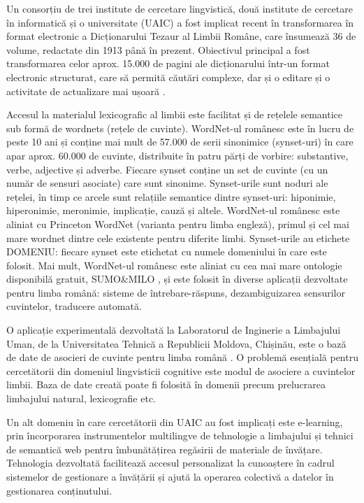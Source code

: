 \begin{multicols}{2}
Un consorțiu de trei institute de cercetare lingvistică, două institute de cercetare în informatică și o universitate (UAIC) a fost implicat recent în transformarea în format electronic a Dicționarului Tezaur al Limbii Române, care însumează 36 de volume, redactate din 1913 până în prezent. Obiectivul principal a fost transformarea celor aprox. 15.000 de pagini ale dicționarului într-un format electronic structurat, care să permită căutări complexe, dar și o editare și o activitate de actualizare mai ușoară \cite{cristea3}.

Accesul la materialul lexicografic al limbii este facilitat și de rețelele semantice sub formă de wordnets (rețele de cuvinte). WordNet-ul românesc este în lucru de peste 10 ani și conține mai mult de 57.000 de serii sinonimice (synset-uri) în care apar aprox. 60.000 de cuvinte, distribuite în patru părți de vorbire: substantive, verbe, adjective și adverbe. Fiecare synset conține un set de cuvinte (cu un număr de sensuri asociate) care sunt sinonime. Synset-urile sunt noduri ale rețelei, în timp ce arcele sunt relațiile semantice dintre synset-uri: hiponimie, hiperonimie, meronimie, implicație, cauză și altele. WordNet-ul românesc este aliniat cu Princeton WordNet \cite{wnURL} (varianta pentru limba engleză), primul și cel mai mare wordnet dintre cele existente pentru diferite limbi. Synset-urile au etichete DOMENIU: fiecare synset este etichetat cu numele domeniului în care este folosit. Mai mult, WordNet-ul românesc este aliniat cu cea mai mare ontologie disponibilă gratuit, SUMO\&MILO \cite{ro_wnURL}, și este folosit în diverse aplicații dezvoltate pentru limba română: sisteme de întrebare-răspuns, dezambiguizarea sensurilor cuvintelor, traducere automată.

O aplicație experimentală dezvoltată la Laboratorul de Inginerie a Limbajului Uman, de la Universitatea Tehnică a Republicii Moldova, Chișinău, este o bază de date de asocieri de cuvinte pentru limba română \cite{sem_dict}. O problemă esențială pentru cercetătorii din domeniul lingvisticii cognitive este modul de asociere a cuvintelor limbii. Baza de date creată poate fi folosită în domenii precum prelucrarea limbajului natural, lexicografie etc.

Un alt domeniu în care cercetătorii din UAIC au fost implicați este e-learning, prin încorporarea instrumentelor multilingve de tehnologie a limbajului și tehnici de semantică web pentru îmbunătățirea regăsirii de materiale de învățare. Tehnologia dezvoltată facilitează accesul personalizat la cunoaștere în cadrul sistemelor de gestionare a învățării și ajută la operarea colectivă a datelor în gestionarea conținutului.


\end{multicols}
